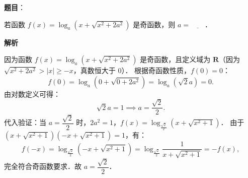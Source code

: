 \begin{answer}

\textbf{题目}：

若函数 $f(x) = \log_a(x + \sqrt{x^2 + 2a^2})$ 是奇函数，则 $a = \underline{\hspace{2em}}$．

\textbf{解析}

因为函数 $f(x) = \log_a(x + \sqrt{x^2 + 2a^2})$ 是奇函数，且定义域为 $\mathbf{R}$（因为 $\sqrt{x^2 + 2a^2} > |x| \geqslant -x$，真数恒大于 $0$）．
根据奇函数性质，$f(0) = 0$：
\nopagebreak[4]
\[
f(0) = \log_a(0 + \sqrt{0 + 2a^2}) = \log_a(\sqrt{2}a) = 0.
\]
由对数定义可得：
\nopagebreak[4]
\[
\sqrt{2}a = 1 \implies a = \dfrac{\sqrt{2}}{2}.
\]
代入验证：当 $a = \dfrac{\sqrt{2}}{2}$ 时，$2a^2 = 1$，$f(x) = \log_{\frac{\sqrt{2}}{2}}(x + \sqrt{x^2 + 1})$．
由于 $(x + \sqrt{x^2 + 1})(-x + \sqrt{x^2 + 1}) = 1$，有：
\nopagebreak[4]
\[
f(-x) = \log_{\frac{\sqrt{2}}{2}}(-x + \sqrt{x^2 + 1}) = \log_{\frac{\sqrt{2}}{2}}\dfrac{1}{x + \sqrt{x^2 + 1}} = -f(x),
\]
完全符合奇函数要求．故 $a = \dfrac{\sqrt{2}}{2}$．


\end{answer}
